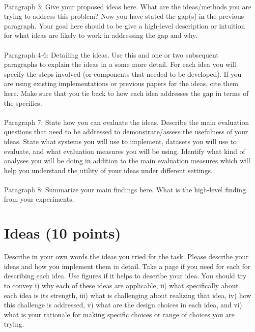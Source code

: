\documentclass[11pt,a4paper]{article}
\begin{document}
\paragraph{}Paragraph 3: Give your proposed ideas here. What are the ideas/methods you are trying to address this problem? Now you have stated the gap(s) in the previous paragraph.
Your goal here should to be give a high-level description or intuition for what ideas are likely to work in addressing the gap and why. 

\paragraph{}Paragraph 4-6: Detailing the ideas. Use this and one or two subsequent paragraphs to explain the ideas in a some more detail. For each idea you will specify the steps involved (or components that needed to be developed).
If you are using existing implementations or previous papers for the ideas, cite them here. Make sure that you tie back to how each idea addresses the gap in terms of the specifics. 

\paragraph{}Paragraph 7: State how you can evaluate the ideas. Describe the main evaluation questions that need to be addressed to demonstrate/assess the usefulness of your ideas. 
State what systems you will use to implement, datasets you will use to evaluate, and what evaluation measures you will be using. Identify what kind of analyses you will be doing in addition to the main 
evaluation measures which will help you understand the utility of your ideas under different settings. 

\paragraph{}Paragraph 8: Summarize your main findings here. What is the high-level finding from your experiments.


\section{Ideas (10 points)}
Describe in your own words the ideas you tried for the task. Please describe your ideas and how you implement them in detail. Take a page if you need for each for describing each idea. Use figures if it helps to describe your idea.  You should try to convey i) why each of these ideas are applicable, ii) what specifically about each idea is its strength, iii) what is challenging about realizing that idea, iv) how this challenge is addressed, v) what are the design choices in each idea, and vi) what is your rationale for making specific choices or range of choices you are trying.
\end{document}
